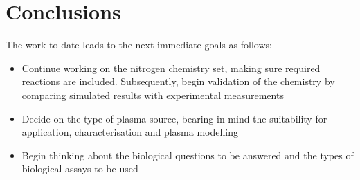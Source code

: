 \documentclass[11pt, oneside]{article}   	%
\begin{document}

%

\section{Conclusions}

The work to date leads to the next immediate goals as follows:
\begin{itemize}
\item Continue working on the nitrogen chemistry set, making sure required reactions are included. Subsequently, begin validation of the chemistry by comparing simulated results with experimental measurements
\item Decide on the type of plasma source, bearing in mind the suitability for application, characterisation and plasma modelling
\item Begin thinking about the biological questions to be answered and the types of biological assays to be used
\end{itemize}

\scriptsize


\end{document}
